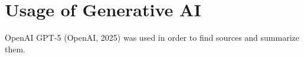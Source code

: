 \chapter*{Usage of Generative AI}
\thispagestyle{empty}

\noindent OpenAI GPT-5 (OpenAI, 2025) was used in order to find sources and summarize them.